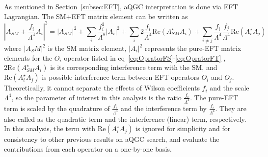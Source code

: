 As mentioned in Section~\ref{subsec:EFT}, aQGC interpretation is done via EFT Lagrangian. 
The SM+EFT matrix element can be written as
\begin{equation}
   |A_{SM}+\frac{f_i}{\Lambda^4}A_i|^2=|A_{SM}|^2+\sum\limits_i \frac{f_i^2}{\Lambda^8}|A_{i}|^2+ \sum\limits_i 2 \frac{f_i}{\Lambda^4} \mathrm{Re}(A_{SM}^\star A_i) +\sum\limits_{i\neq j} \frac{f_i}{\Lambda^4} \frac{f_j}{\Lambda^4} \mathrm{Re}(A_i^\star A_j)
\end{equation}
where $|A_SM|^2$ is the SM matrix element, $|A_{i}|^2$ represents the pure-EFT matrix elements for the $O_{i}$ operator listed in eq~\ref{eq:OpratorFS}-\ref{eq:OpratorFT} , $2 \mathrm{Re}(A_{SM}^\star A_i)$ is its corresponding interference term with the SM, and $\mathrm{Re}(A_i^\star A_j)$ is possible interference term between EFT operators $O_{i}$ and $O_{j}$. 
Theoretically, it cannot separate the effects of Wilson coefficients $f_i$ and the scale $\Lambda^4$, so the parameter of interest in this analysis is the ratio $\frac{f_i}{\Lambda^4}$. %
The pure-EFT term is scaled by the quadrature of $\frac{f_i}{\Lambda^4}$ and the interference term by $\frac{f_{i}}{\Lambda^4}$.
They are also called as the quadratic term and the interference (linear) term, respectively.
In this analysis, the term with $\mathrm{Re}(A_i^\star A_j)$ is ignored for simplicity and for consistency to other previous results on aQGC search, and evaluate the contributions from each operator on a one-by-one basis.
